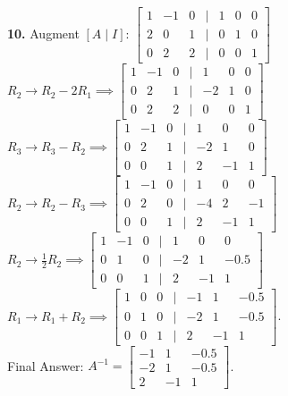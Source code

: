 \documentclass{article}
\begin{document}
\vspace{5pt}
\noindent
\textbf{10.} Augment $[A \mid I]$:
$\begin{bmatrix} 1 & -1 & 0 & \mid & 1 & 0 & 0 \\ 2 & 0 & 1 & \mid & 0 & 1 & 0 \\ 0 & 2 & 2 & \mid & 0 & 0 & 1 \end{bmatrix}$ \\
$R_2 \to R_2 - 2R_1 \implies \begin{bmatrix} 1 & -1 & 0 & \mid & 1 & 0 & 0 \\ 0 & 2 & 1 & \mid & -2 & 1 & 0 \\ 0 & 2 & 2 & \mid & 0 & 0 & 1 \end{bmatrix}$ \\
$R_3 \to R_3 - R_2 \implies \begin{bmatrix} 1 & -1 & 0 & \mid & 1 & 0 & 0 \\ 0 & 2 & 1 & \mid & -2 & 1 & 0 \\ 0 & 0 & 1 & \mid & 2 & -1 & 1 \end{bmatrix}$ \\
$R_2 \to R_2 - R_3 \implies \begin{bmatrix} 1 & -1 & 0 & \mid & 1 & 0 & 0 \\ 0 & 2 & 0 & \mid & -4 & 2 & -1 \\ 0 & 0 & 1 & \mid & 2 & -1 & 1 \end{bmatrix}$ \\
$R_2 \to \frac{1}{2}R_2 \implies \begin{bmatrix} 1 & -1 & 0 & \mid & 1 & 0 & 0 \\ 0 & 1 & 0 & \mid & -2 & 1 & -0.5 \\ 0 & 0 & 1 & \mid & 2 & -1 & 1 \end{bmatrix}$ \\
$R_1 \to R_1 + R_2 \implies \begin{bmatrix} 1 & 0 & 0 & \mid & -1 & 1 & -0.5 \\ 0 & 1 & 0 & \mid & -2 & 1 & -0.5 \\ 0 & 0 & 1 & \mid & 2 & -1 & 1 \end{bmatrix}$. \\
Final Answer: $A^{-1} = \begin{bmatrix} -1 & 1 & -0.5 \\ -2 & 1 & -0.5 \\ 2 & -1 & 1 \end{bmatrix}$.
\end{document}
